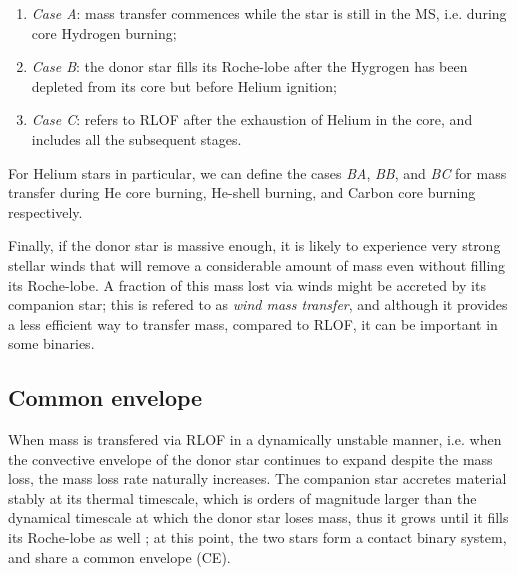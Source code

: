 \documentclass[../../main/thesis_msc.tex]{subfiles}
\begin{document}
				\begin{enumerate}[label=(\roman*)]
					\item \emph{Case A}: mass transfer commences while the star is still in the MS, i.e. during core Hydrogen burning;
					\item \emph{Case B}: the donor star fills its Roche-lobe after the Hygrogen has been depleted from its core but before Helium ignition;
					\item \emph{Case C}: refers to RLOF after the exhaustion of Helium in the core, and includes all the subsequent stages.
				\end{enumerate}
				For Helium stars in particular, we can define the cases \emph{BA}, \emph{BB}, and \emph{BC} for mass transfer during He core burning, He-shell burning, and Carbon core burning respectively.
				
				Finally, if the donor star is massive enough, it is likely to experience very strong stellar winds that will remove a considerable amount of mass even without filling its Roche-lobe. A fraction of this mass lost via winds might be accreted by its companion star; this is refered to as \emph{wind mass transfer}, and although it provides a less efficient way to transfer mass, compared to RLOF, it can be important in some binaries.
				
			\subsection{Common envelope}
			
				When mass is transfered via RLOF in a dynamically unstable manner, i.e. when the convective envelope of the donor star continues to expand despite the mass loss, the mass loss rate naturally increases. The companion star accretes material stably at its thermal timescale, which is orders of magnitude larger than the dynamical timescale at which the donor star loses mass, thus it grows until it fills its Roche-lobe as well \citep{Izzard_CE}; at this point, the two stars form a contact binary system, and share a common envelope (CE).
				
\end{document}

